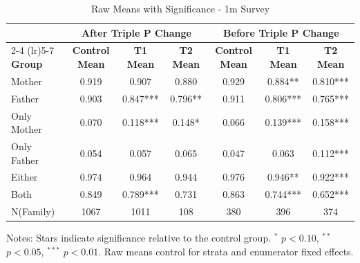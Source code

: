 \begin{table}[htbp]
\centering
\begin{threeparttable}
\caption{Raw Means with Significance  - 1m Survey}
\begin{tabular}{lcccccc}
\toprule
& \multicolumn{3}{c}{After Triple P Change} & \multicolumn{3}{c}{Before Triple P Change} \\
\cmidrule(lr){2-4} \cmidrule(lr){5-7}
\textbf{Group} & \textbf{Control Mean} & \textbf{T1 Mean} & \textbf{T2 Mean} & \textbf{Control Mean} & \textbf{T1 Mean} & \textbf{T2 Mean} \\
\midrule
Mother &  0.919 & 0.907 &  0.880 & 0.929 & 0.884** &  0.810***\\
Father &  0.903 &  0.847*** &  0.796** & 0.911 &  0.806*** &  0.765*** \\
Only Mother &  0.070 & 0.118*** &  0.148* &  0.066 & 0.139*** &  0.158***  \\
Only Father &  0.054 &  0.057 &  0.065 &  0.047 &  0.063 &  0.112*** \\
Either &  0.974 &  0.964 &  0.944 &  0.976 &  0.946** &  0.922*** \\
Both &  0.849 &  0.789*** &  0.731 & 0.863 &  0.744*** &  0.652*** \\
N(Family) & 1067 & 1011 & 108 &  380 & 396 & 374 \\
\bottomrule
\end{tabular}
\begin{tablenotes}
\small
Notes: Stars indicate significance relative to the control group. 
$^{*}$ $p<0.10$, $^{**}$ $p<0.05$, $^{***}$ $p<0.01$.
Raw means control for strata and enumerator fixed effects.
\end{tablenotes}
\end{threeparttable}
\end{table}

